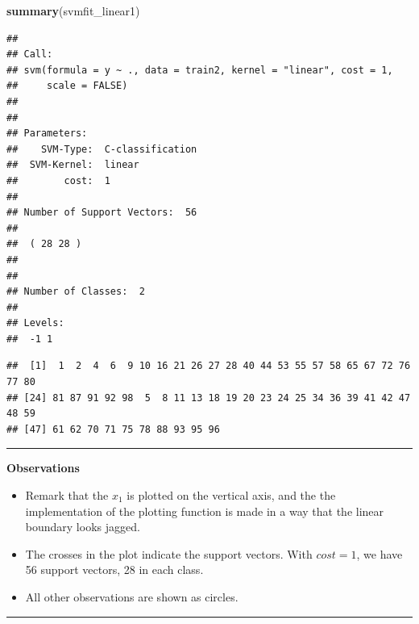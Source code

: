 \documentclass[]{article}
\newenvironment{Shaded}{\begin{snugshade}}{\end{snugshade}}
\newcommand{\CommentTok}[1]{\textcolor[rgb]{0.56,0.35,0.01}{\textit{#1}}}
\newcommand{\KeywordTok}[1]{\textcolor[rgb]{0.13,0.29,0.53}{\textbf{#1}}}
\newcommand{\NormalTok}[1]{#1}
\newcommand{\OperatorTok}[1]{\textcolor[rgb]{0.81,0.36,0.00}{\textbf{#1}}}
\providecommand{\tightlist}{%
  \setlength{\itemsep}{0pt}\setlength{\parskip}{0pt}}
\begin{document}
\begin{Shaded}
\begin{Highlighting}[]
\KeywordTok{summary}\NormalTok{(svmfit_linear1)}
\end{Highlighting}
\end{Shaded}

\begin{verbatim}
## 
## Call:
## svm(formula = y ~ ., data = train2, kernel = "linear", cost = 1, 
##     scale = FALSE)
## 
## 
## Parameters:
##    SVM-Type:  C-classification 
##  SVM-Kernel:  linear 
##        cost:  1 
## 
## Number of Support Vectors:  56
## 
##  ( 28 28 )
## 
## 
## Number of Classes:  2 
## 
## Levels: 
##  -1 1
\end{verbatim}

\begin{Shaded}
\end{Shaded}

\begin{verbatim}
##  [1]  1  2  4  6  9 10 16 21 26 27 28 40 44 53 55 57 58 65 67 72 76 77 80
## [24] 81 87 91 92 98  5  8 11 13 18 19 20 23 24 25 34 36 39 41 42 47 48 59
## [47] 61 62 70 71 75 78 88 93 95 96
\end{verbatim}

\normalsize

\begin{center}\rule{0.5\linewidth}{\linethickness}\end{center}

\textbf{Observations}

\begin{itemize}
\tightlist
\item
  Remark that the \(x_1\) is plotted on the vertical axis, and the the
  implementation of the plotting function is made in a way that the
  linear boundary looks jagged.
\item
  The crosses in the plot indicate the support vectors. With \(cost=1\),
  we have 56 support vectors, 28 in each class.
\item
  All other observations are shown as circles.
\end{itemize}

\begin{center}\rule{0.5\linewidth}{\linethickness}\end{center}
\end{document}
